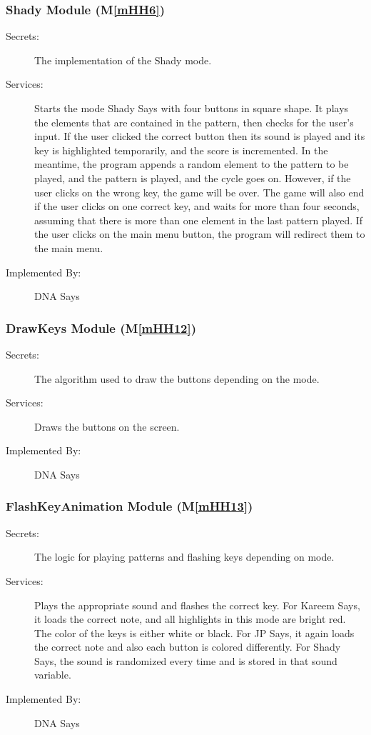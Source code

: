 \documentclass[12pt, titlepage]{article}
\newcommand{\mref}[1]{M\ref{#1}}
\begin{document}
\subsubsection{Shady Module (\mref{mHH6})}
\begin{description}
\item[Secrets:] The implementation of the Shady mode.
\item[Services:]Starts the mode Shady Says with four buttons in square shape. It plays the elements that are contained in the pattern, then checks for the user's input. If the user clicked the correct button then its sound is played and its key is highlighted temporarily, and the score is incremented. In the meantime, the program appends a random element to the pattern to be played, and the pattern is played, and the cycle goes on. However, if the user clicks on the wrong key, the game will be over. The game will also end if the user clicks on one correct key, and waits for more than four seconds, assuming that there is more than one element in the last pattern played. If the user clicks on the main menu button, the program will redirect them to the main menu.
\item[Implemented By:] DNA Says
\end{description}

\subsubsection{DrawKeys Module (\mref{mHH12})}
\begin{description}
\item[Secrets:]The algorithm used to draw the buttons depending on the mode.
\item[Services:]Draws the buttons on the screen.
\item[Implemented By:] DNA Says
\end{description}

\subsubsection{FlashKeyAnimation Module (\mref{mHH13})}
\begin{description}
\item[Secrets:]The logic for playing patterns and flashing keys depending on mode.
\item[Services:]Plays the appropriate sound and flashes the correct key. For Kareem Says, it loads the correct note, and all highlights in this mode are bright red. The color of the keys is either white or black. For JP Says, it again loads the correct note and also each button is colored differently. For Shady Says, the sound is randomized every time and is stored in that sound variable.
\item[Implemented By:] DNA Says
\end{description}
\end{document}

